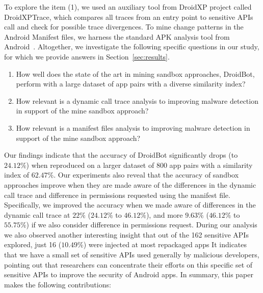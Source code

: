To explore the item (1), we used an auxiliary tool from DroidXP project called DroidXPTrace, which compares all traces from an entry point to sensitive APIs call and check for possible trace divergences. To {\color{blue}mine change patterns} in the Android Manifest files, we harness the standard APK analysis tool from Android~\cite{au2011short}. Altogether, we investigate the following specific questions in our study, for which we provide answers in Section~\ref{sec:results}.


\begin{enumerate}[(RQ1)]
 \item How well does the state of the art in mining sandbox approaches, DroidBot, perform with a large dataset of app pairs with a diverse similarity index?
 \item How relevant is a dynamic call trace analysis to improving malware detection in support of the mine sandbox approach?
 \item How relevant is a manifest files analysis to improving malware detection in support of the mine sandbox approach?
\end{enumerate}
 

Our findings indicate that the accuracy of DroidBot significantly drops (to $24.12\%$) when reproduced on a larger dataset of $800$ app pairs with a similarity index of $62.47\%$. Our experiments also reveal that the accuracy of sandbox approaches improve when they are made aware of the differences in the dynamic call trace and difference in permissions requested using the manifest file. Specifically, we improved the accuracy when we made aware of differences in the dynamic call trace at $22\%$ ($24.12\%$ to $46.12\%$), and more $9.63\%$ ($46.12\%$ to $55.75\%$) if we also consider difference in permissions request. %
During our analysis we also observed another interesting insight that out of the 162 sensitive APIs explored, just 16 ($10.49$\%) were injected at most repackaged apps 
It indicates that we have a small set of sensitive APIs used generally by malicious developers, pointing out that researchers can concentrate their efforts on this specific set of sensitive APIs to improve the security of Android apps. 
In summary, this paper makes the following contributions:

